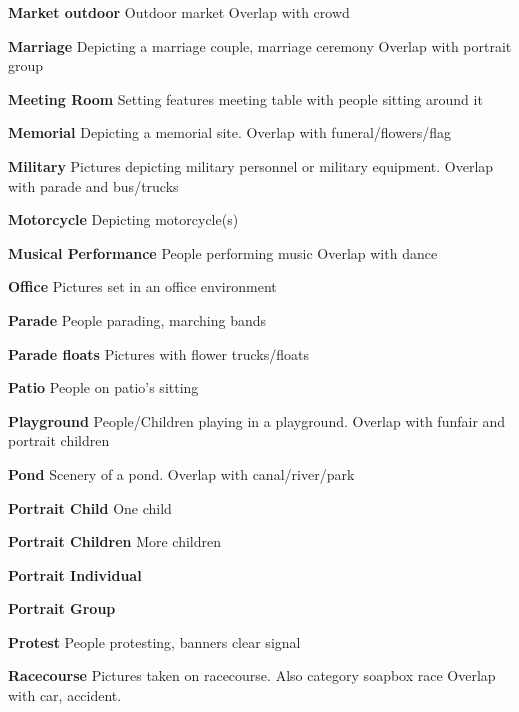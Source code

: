 \noindent\textbf{Market outdoor}
Outdoor market
Overlap with crowd

\noindent\textbf{Marriage}
Depicting a marriage couple, marriage ceremony
Overlap with portrait group


\noindent\textbf{Meeting Room}
Setting features meeting table with people sitting around it

\noindent\textbf{Memorial}
Depicting a memorial site. Overlap with funeral/flowers/flag

\noindent\textbf{Military}
Pictures depicting military personnel or military equipment. Overlap with parade and bus/trucks

\noindent\textbf{Motorcycle}
Depicting motorcycle(s)


\noindent\textbf{Musical Performance}
People performing music
Overlap with dance

\noindent\textbf{Office}
Pictures set in an office environment

\noindent\textbf{Parade}
People parading, marching bands

\noindent\textbf{Parade floats}
Pictures with flower trucks/floats

\noindent\textbf{Patio}
People on patio’s sitting

\noindent\textbf{Playground}
People/Children playing in a playground. Overlap with funfair and portrait children


\noindent\textbf{Pond}
Scenery of a pond. Overlap with canal/river/park

\noindent\textbf{Portrait Child}
One child

\noindent\textbf{Portrait Children}
More children

\noindent\textbf{Portrait Individual}

\noindent\textbf{Portrait Group}

\noindent\textbf{Protest}
People protesting, banners clear signal

\noindent\textbf{Racecourse}
Pictures taken on racecourse. Also category soapbox race
Overlap with car, accident. 

%

